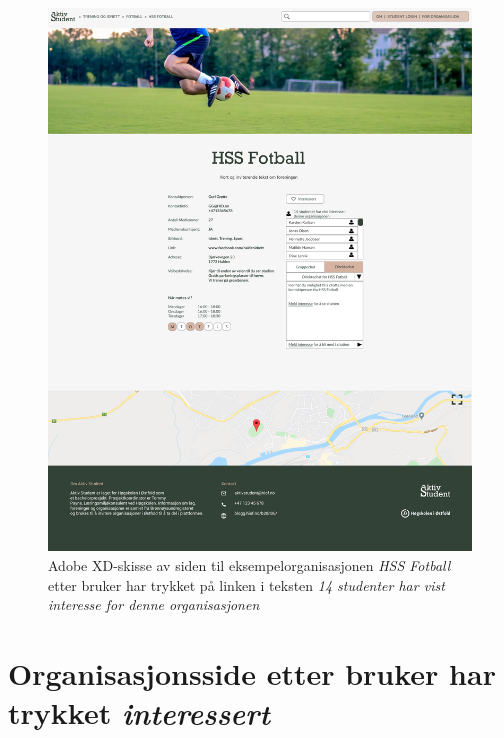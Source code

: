 \begin{figure}[H]
\centering
\includegraphics[width=\textwidth]{Illustrasjoner/Skisser-pdf/3.0/3-5-interesserte-organisasjon.pdf}
\caption{Adobe XD-skisse av siden til eksempelorganisasjonen {\em HSS Fotball} etter bruker har trykket på linken i teksten {\em 14 studenter har vist interesse for denne organisasjonen}}
\label{vedlegg:3-5-andre-interesserte-org}
\end{figure}

\section{Organisasjonsside etter bruker har trykket {\em interessert}}

